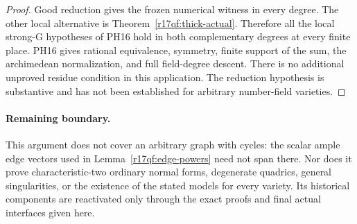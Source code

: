 \begin{proof}
Good reduction gives the frozen numerical witness in every
degree.  The other local alternative is
Theorem~\ref{r17qf:thick-actual}.  Therefore all the local
strong-G hypotheses of PH16 hold in both complementary
degrees at every finite place.  PH16 gives rational
equivalence, symmetry, finite support of the sum, the
archimedean normalization, and full field-degree descent.
There is no additional unproved residue condition in this
application.  The reduction hypothesis is substantive and
has not been established for arbitrary number-field varieties.
\end{proof}

\paragraph{Remaining boundary.}
This argument does not cover an arbitrary graph with cycles:
the scalar ample edge vectors used in
Lemma~\ref{r17qf:edge-powers} need not span there.  Nor does
it prove characteristic-two ordinary normal forms, degenerate
quadrics, general singularities, or the existence of the
stated models for every variety.  Its historical components
are reactivated only through the exact proofs and final
actual interfaces given here.

